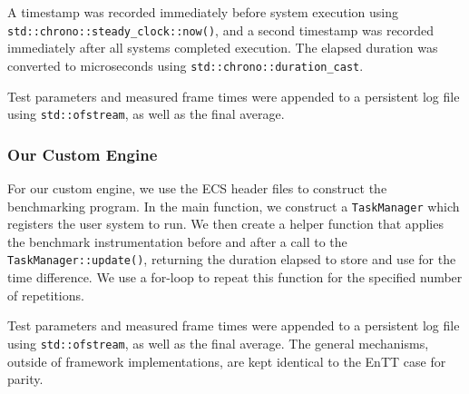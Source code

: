 A timestamp was recorded immediately before system execution using \texttt{std::chrono::steady\_clock::now()},
and a second timestamp was recorded immediately after all systems completed execution.
The elapsed duration was converted to microseconds using \texttt{std::chrono::duration\_cast}.

Test parameters and measured frame times were appended to a persistent log file using \texttt{std::ofstream},
as well as the final average.

\subsubsection*{Our Custom Engine}

For our custom engine, we use the ECS header files to construct the benchmarking program.
In the main function, we construct a \texttt{TaskManager} which registers the user system to run.
We then create a helper function that applies the benchmark instrumentation before and after
a call to the \texttt{TaskManager::update()}, returning the duration elapsed to store and use for the time difference.
We use a for-loop to repeat this function for the specified number of repetitions.

Test parameters and measured frame times were appended to a persistent log file using \texttt{std::ofstream},
as well as the final average.
The general mechanisms, outside of framework implementations, are kept identical to the EnTT case for parity.